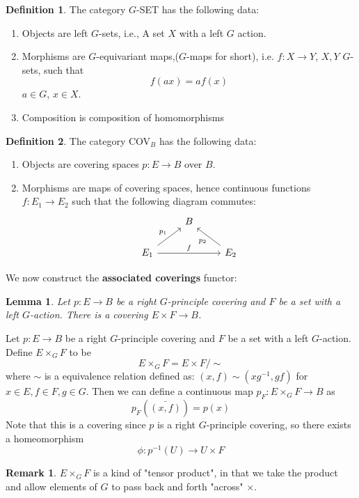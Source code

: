 \documentclass{article}
\newtheorem{lem}{Lemma}[section]
\theoremstyle{definition}
\newtheorem{remark}{Remark}
\newtheorem{defn}{Definition}[section]
\begin{document}
\begin{defn}
The category $G$-SET has the following data:
\begin{enumerate}
    \item Objects are left $G$-sets, i.e., A set $X$ with a left $G$ action.
    \item Morphisms are $G$-equivariant maps,($G$-maps for short), i.e. $f:X \rightarrow Y$, $X,Y$ $G$-sets, such that $$f(ax)=af(x)$$ $a\in G$, $x\in X$. 
    \item Composition is composition of homomorphisms
\end{enumerate}
\end{defn}
\begin{defn}
The category COV$_B$ has the following data:
\begin{enumerate}
    \item Objects are covering spaces $p: E \rightarrow B$ over $B$.
    \item Morphisms are maps of covering spaces, hence continuous functions $f: E_1 \rightarrow E_2$ such that the following diagram commutes: 
    $$\begin{tikzcd}
{} & B  \\
    E_1 \arrow{ur}{p_1} \arrow{rr}{f} && E_2 \arrow{ul}{p_2}
\end{tikzcd}$$
\end{enumerate}
\end{defn}
\noindent We now construct the \textbf{associated coverings} functor: 
\begin{lem}
Let $p: E \rightarrow B$ be a right $G$-principle covering and $F$ be a set with a left $G$-action. There is a covering $E\times F\rightarrow B$.
\end{lem}
Let $p: E \rightarrow B$ be a right $G$-principle covering and $F$ be a set with a left $G$-action. Define $E \times_{G} F$ to be $$E \times_{G} F=E \times F / \sim$$ where $\sim$ is a equivalence relation defined as: $(x,f)\sim (xg^{-1},gf)$ for $x\in E,f\in F,g\in G$.  Then we can define a continuous map $p_F: E \times_{G} F \rightarrow B$ as $$p_F(\bar{(x,f)})=p(x)$$ Note that this is a covering since $p$ is a right $G$-principle covering, so there exists a homeomorphism $$\phi:p^{-1}(U)\rightarrow U \times F$$  

\begin{remark}
$E\times_{G}F$ is a kind of "tensor product", in that we take the product and allow elements of $G$ to pass back and forth "across" $\times$.
\end{remark}
\end{document}
